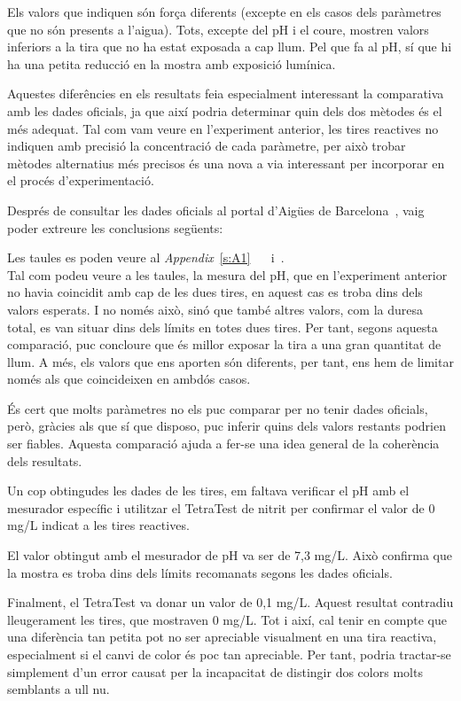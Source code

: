 Els valors que indiquen són força diferents (excepte en els casos dels paràmetres que no són presents a l’aigua). Tots, excepte del pH i el coure, mostren valors inferiors a la tira que no ha estat exposada a cap llum. Pel que fa al pH, sí que hi ha una petita reducció en la mostra amb exposició lumínica.

Aquestes diferêncies en els resultats feia especialment interessant la comparativa amb les dades oficials, ja que així podria determinar quin dels dos mètodes és el més adequat. Tal com vam veure en l’experiment anterior, les tires reactives no indiquen amb precisió la concentració de cada paràmetre, per això trobar mètodes alternatius més precisos és una nova a via interessant per incorporar en el procés d’experimentació.

Després de consultar les dades oficials al portal d’Aigües de Barcelona~\cite{qualitatAigua}, vaig poder extreure les conclusions següents:

Les taules es poden veure al \textit{Appendix}~\ref{s:A1}~ ~ i~.\\

Tal com podeu veure a les taules, la mesura del pH, que en l’experiment anterior no havia coincidit amb cap de les dues tires, en aquest cas es troba dins dels valors esperats. I no només això, sinó que també altres valors, com la duresa total, es van situar dins dels límits en totes dues tires. Per tant, segons aquesta comparació, puc concloure que és millor exposar la tira a una gran quantitat de llum. A més, els valors que ens aporten són diferents, per tant, ens hem de limitar només als que coincideixen en ambdós casos.

És cert que molts paràmetres no els puc comparar per no tenir dades oficials, però, gràcies als que sí que disposo, puc inferir quins dels valors restants podrien ser fiables. Aquesta comparació ajuda a fer-se una idea general de la coherència dels resultats.

Un cop obtingudes les dades de les tires, em faltava verificar el pH amb el mesurador específic i utilitzar el TetraTest de nitrit per confirmar el valor de 0 mg/L indicat a les tires reactives.

El valor obtingut amb el mesurador de pH va ser de 7,3 mg/L. Això confirma que la mostra es troba dins dels límits recomanats segons les dades oficials.

Finalment, el TetraTest va donar un valor de 0,1 mg/L. Aquest resultat contradiu lleugerament les tires, que mostraven 0 mg/L. Tot i així, cal tenir en compte que una diferència tan petita pot no ser apreciable visualment en una tira reactiva, especialment si el canvi de color és poc tan apreciable. Per tant, podria tractar-se simplement d’un error causat per la incapacitat de distingir dos colors molts semblants a ull nu.

